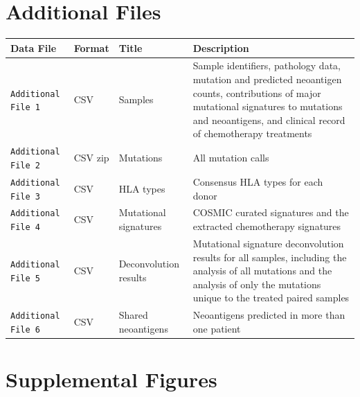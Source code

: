 
\pagebreak
\section*{Additional Files}

\setcounter{equation}{0}
\setcounter{figure}{0}
\setcounter{table}{0}
\makeatletter
\renewcommand{\theequation}{S\arabic{equation}}
\renewcommand{\thefigure}{S\arabic{figure}}

\begin{center}
    \begin{tabular}{ | l | l | l | p{8cm} |}
    \hline
    Data File & Format & Title & Description \\ \hline
    \texttt{Additional File 1} & CSV & Samples & Sample identifiers, pathology data, mutation and predicted neoantigen counts, contributions of major mutational signatures to mutations and neoantigens, and clinical record of chemotherapy treatments \\ \hline

    \texttt{Additional File 2} & CSV zip & Mutations & All mutation calls \\ \hline
    
    \texttt{Additional File 3} & CSV & HLA types & Consensus HLA types for each donor \\ \hline
    
    \texttt{Additional File 4} & CSV & Mutational signatures & COSMIC curated signatures and the extracted chemotherapy signatures \\ \hline

    \texttt{Additional File 5} & CSV & Deconvolution results & Mutational signature deconvolution results for all samples, including the analysis of all mutations and the analysis of only the mutations unique to the treated paired samples  \\ \hline
    
    \texttt{Additional File 6} & CSV & Shared neoantigens & Neoantigens predicted in more than one patient  \\ \hline
    \end{tabular}
\end{center}


\section*{Supplemental Figures}

